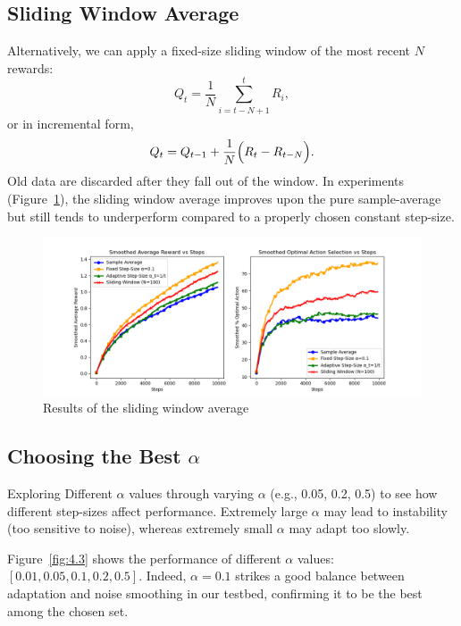 \documentclass{article}
\begin{document}
\subsection{Sliding Window Average}

Alternatively, we can apply a fixed-size sliding window of the most recent \(N\) rewards:
\[
Q_t = \frac{1}{N} \sum_{i=t-N+1}^{t} R_i,
\]
or in incremental form,
\[
Q_t = Q_{t-1} + \frac{1}{N} \Bigl( R_t - R_{t-N} \Bigr).
\]
Old data are discarded after they fall out of the window. In experiments (Figure~\ref{fig:4.2}), the sliding window average improves upon the pure sample-average but still tends to underperform compared to a properly chosen constant step-size.



\begin{figure}[h!]
\centering
\includegraphics[width=\linewidth]{figure5.png}
\caption{Results of the sliding window average}
\label{fig:4.2}
\end{figure}








\subsection{Choosing the Best \(\alpha\)}


Exploring Different \(\alpha\) values through varying \(\alpha\) (e.g., 0.05, 0.2, 0.5) to see how different step-sizes affect performance. Extremely large \(\alpha\) may lead to instability (too sensitive to noise), whereas extremely small \(\alpha\) may adapt too slowly.

Figure~\ref{fig:4.3} shows the performance of different \(\alpha\) values: \([0.01, 0.05, 0.1, 0.2, 0.5]\). Indeed, \(\alpha = 0.1\) strikes a good balance between adaptation and noise smoothing in our testbed, confirming it to be the best among the chosen set.
\end{document}
